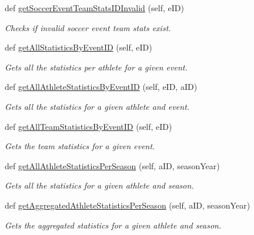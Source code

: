 \begin{DoxyCompactItemize}
def \hyperlink{classhandler_1_1dao_1_1soccer__event__dao_1_1_soccer_event_d_a_o_a7c19d8af145fc4d6dd81cc87f30e94b4}{get\+Soccer\+Event\+Team\+Stats\+I\+D\+Invalid} (self, e\+ID)
\begin{DoxyCompactList}\small\item\em Checks if invalid soccer event team stats exist. \end{DoxyCompactList}\item 
def \hyperlink{classhandler_1_1dao_1_1soccer__event__dao_1_1_soccer_event_d_a_o_a57749c2c503be1b9696024682fd3b0fe}{get\+All\+Statistics\+By\+Event\+ID} (self, e\+ID)
\begin{DoxyCompactList}\small\item\em Gets all the statistics per athlete for a given event. \end{DoxyCompactList}\item 
def \hyperlink{classhandler_1_1dao_1_1soccer__event__dao_1_1_soccer_event_d_a_o_adbd71f58b07d602ada5bf42995d1c364}{get\+All\+Athlete\+Statistics\+By\+Event\+ID} (self, e\+ID, a\+ID)
\begin{DoxyCompactList}\small\item\em Gets all the statistics for a given athlete and event. \end{DoxyCompactList}\item 
def \hyperlink{classhandler_1_1dao_1_1soccer__event__dao_1_1_soccer_event_d_a_o_a2ec12ce0b813eb9cbfce32f4659e4498}{get\+All\+Team\+Statistics\+By\+Event\+ID} (self, e\+ID)
\begin{DoxyCompactList}\small\item\em Gets the team statistics for a given event. \end{DoxyCompactList}\item 
def \hyperlink{classhandler_1_1dao_1_1soccer__event__dao_1_1_soccer_event_d_a_o_a63255f16ae44ee2964f47a8c73a0c342}{get\+All\+Athlete\+Statistics\+Per\+Season} (self, a\+ID, season\+Year)
\begin{DoxyCompactList}\small\item\em Gets all the statistics for a given athlete and season. \end{DoxyCompactList}\item 
def \hyperlink{classhandler_1_1dao_1_1soccer__event__dao_1_1_soccer_event_d_a_o_ab2cfce918ec805e7eab71acc5172aa86}{get\+Aggregated\+Athlete\+Statistics\+Per\+Season} (self, a\+ID, season\+Year)
\begin{DoxyCompactList}\small\item\em Gets the aggregated statistics for a given athlete and season. \end{DoxyCompactList}\item 

\end{DoxyCompactItemize}
